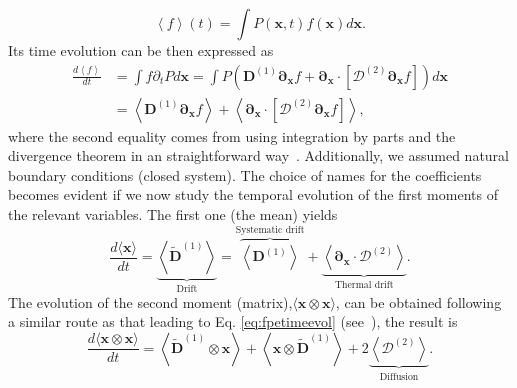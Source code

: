 \documentclass[ twoside,openright,titlepage,numbers=noenddot,%
headinclude,footinclude,cleardoublepage=empty,abstract=on,
BCOR=5mm,paper=b5,fontsize=11pt, dvipsnames
]{scrreprt}
\renewcommand{\vec}[1]{\bm{#1}}
\newcommand{\tens}[1]{\bm{\mathcal{#1}}}
\begin{document}
\begin{equation}
  \left\langle f\right\rangle(t) = \int {P(\vec{x},t) f(\vec{x}) d\vec{x}}.
\end{equation}
Its time evolution can be then expressed as
\begin{equation}
\label{eq:fpetimeevol}  
  \begin{aligned}
    \frac{d\left\langle f\right\rangle}{dt} &= \int{f\partial_tPd\vec{x}} = \int{P\left(\vec{D}^{(1)}\vec{\partial}_{\vec{x}}f + \vec{\partial}_{\vec{x}}\cdot\left[\tens{D}^{(2)} \vec{\partial}_{\vec{x}}f\right]\right)d\vec{x}}\\
    &= \left\langle \vec{D}^{(1)} \vec{\partial}_{\vec{x}}f\right\rangle + \left\langle \vec{\partial}_{\vec{x}}\cdot\left[\tens{D}^{(2)}\vec\partial_{\vec{x}}f\right]\right\rangle,
  \end{aligned}
\end{equation}
where the second equality comes from using integration by parts and the divergence theorem in an straightforward way~\cite{Risken2012}. Additionally, we assumed natural boundary conditions (closed system).
The choice of names for the coefficients becomes evident if we now study the temporal evolution of the first moments of the relevant variables. The first one (the mean) yields
\begin{equation}
  \label{eq:fpemean}  
  \frac{d\langle\vec{x}\rangle}{dt} = \underbrace{\left\langle \widetilde{\vec{D}}^{(1)}\right\rangle}_{\text{Drift}} = \overbrace{\left\langle \vec{D}^{(1)}\right\rangle}^{\text{Systematic drift}} + \underbrace{\left\langle \vec{\partial}_{\vec{x}}\cdot\tens{D}^{(2)}\right\rangle}_{\text{Thermal drift}}.
\end{equation}
The evolution of the second moment (matrix),$\langle \vec{x}\otimes\vec{x}\rangle$, can be obtained following a similar route as that leading to Eq. \eqref{eq:fpetimeevol} (see~\cite{Risken2012}), the result is
\begin{equation}
  \label{eq:fpevar}
  \frac{d\langle \vec{x}\otimes\vec{x}\rangle}{dt} = \left\langle \widetilde{\vec{D}}^{(1)}\otimes\vec{x}\right\rangle + \left\langle \vec{x}\otimes\widetilde{\vec{D}}^{(1)}\right\rangle + 2\underbrace{\left\langle \tens{D}^{(2)}\right\rangle}_{\text{Diffusion}}.
\end{equation}
\end{document}
